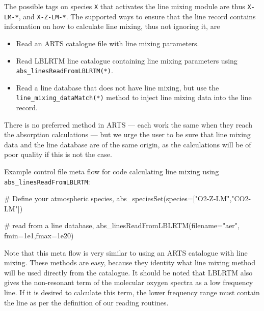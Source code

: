The possible tags on species \verb|X| that activates the line mixing module are thus
\verb|X-LM-*|, and \verb|X-Z-LM-*|.
The supported ways to ensure that the line record contains information on
how to calculate line mixing, thus not ignoring it, are 
\begin{itemize}
 \item Read an ARTS catalogue file with line mixing parameters.
 \item Read LBLRTM line catalogue containing line mixing parameters using 
 \verb|abs_linesReadFromLBLRTM(*)|.
 \item Read a line database that does not have line mixing, but use the 
 \verb|line_mixing_dataMatch(*)| method to inject line mixing data into the line record.
\end{itemize}
There is no preferred method in ARTS --- each work the same when they reach the absorption
calculations --- but we urge the user to be sure that line mixing data and the line database
are of the same origin, as the calculations will be of poor quality if this is not the case.

Example control file meta flow for code calculating line mixing using \verb|abs_linesReadFromLBLRTM|:
\begin{code}
# Define your atmospheric species,
abs_speciesSet(species=["O2-Z-LM","CO2-LM"])

# read from a line database,
abs_linesReadFromLBLRTM(filename="aer", 
    fmin=1e1,fmax=1e20)
\end{code}
Note that this meta flow is very similar to using an ARTS catalogue with line mixing.
These methods are easy, because they identity what line mixing method will be used 
directly from the catalogue.
It should be noted that LBLRTM also gives the non-resonant term of the molecular oxygen
spectra as a low frequency line.  If it is desired to calculate this term, the lower
frequency range must contain the line as per the definition of our reading routines.

